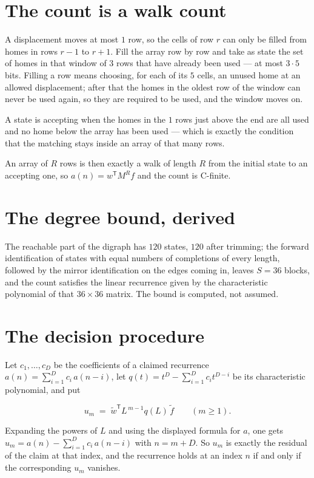 \documentclass[11pt]{article}
\theoremstyle{definition}
\begin{document}
\section{The count is a walk count}

A displacement moves at most $1$ row, so the cells of row $r$ can only be filled from homes in rows $r-1$ to $r+1$. Fill the array row by row and take as state the set of homes in that window of $3$ rows that have already been used --- at most $3\cdot5$ bits. Filling a row means choosing, for each of its $5$ cells, an unused home at an allowed displacement; after that the homes in the oldest row of the window can never be used again, so they are required to be used, and the window moves on.

A state is accepting when the homes in the $1$ rows just above the end are all used and no home below the array has been used --- which is exactly the condition that the matching stays inside an array of that many rows.

An array of $R$ rows is then exactly a walk of length $R$ from the initial state to an accepting one, so $a(n) = w^{\mathsf T}M^{R}f$ and the count is C-finite.

\section{The degree bound, derived}

The reachable part of the digraph has $120$ states, $120$ after trimming; the forward identification of states with equal numbers of completions of every length, followed by the mirror identification on the edges coming in, leaves $S = 36$ blocks, and the count satisfies the linear recurrence given by the characteristic polynomial of that $36\times36$ matrix. The bound is computed, not assumed.

\section{The decision procedure}

Let $c_1,\dots,c_D$ be the coefficients of a claimed recurrence $a(n) = \sum_{i=1}^{D} c_i\,a(n-i)$, let $q(t) = t^{D} - \sum_{i=1}^{D} c_i t^{D-i}$ be its characteristic polynomial, and put

\[u_m \;=\; \tilde w^{\mathsf T} L^{\,m-1} q(L)\,\tilde f \qquad (m \ge 1).\]

Expanding the powers of $L$ and using the displayed formula for $a$, one gets $u_m = a(n) - \sum_{i=1}^{D} c_i\,a(n-i)$ with $n = m + D$. So $u_m$ is exactly the residual of the claim at that index, and the recurrence holds at an index $n$ if and only if the corresponding $u_m$ vanishes.
\end{document}
